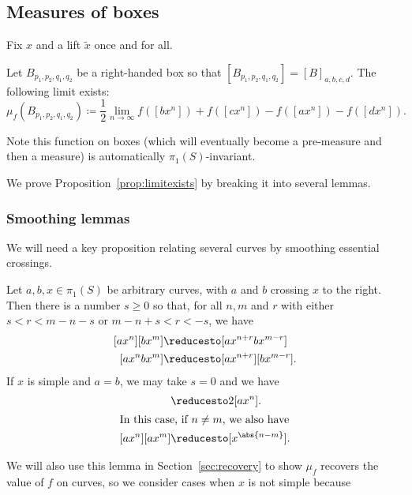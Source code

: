 \subsection{Measures of boxes}

Fix $x$ and a lift $\tilde{x}$ once and for all.

\begin{proposition}
\label{prop:limitexists}
Let $B_{p_1,p_2,q_1,q_2}$ be a right-handed box so that $[B_{p_1,p_2,q_1,q_2}]=[B]_{a,b,c,d}$.
The following limit exists:
\[
\mu_{f}(B_{p_1,p_2,q_1,q_2})\coloneqq\frac{1}{2}\lim_{n \to \infty}f([bx^n]) + f([cx^n])-f([ax^n]) - f([dx^n]).
\]
\end{proposition}
Note this function on boxes (which will eventually become a pre-measure and
then a measure) is automatically $\pi_1(S)$-invariant.

We prove Proposition~\ref{prop:limitexists} by breaking it into several lemmas.

\subsubsection{Smoothing lemmas}

We will need a key proposition relating several curves by smoothing
essential crossings.

\begin{figure}
\end{figure}

\begin{proposition}\label{prop:join-split-geom}
Let $a,b,x \in \pi_1(S)$ be arbitrary curves, with $a$ and $b$
crossing $x$ to the right. Then there is a number $s \ge 0$
  so that, for all
 $n,m$ and $r$ with either $s < r < m-n-s$ or $m-n+s < r < -s$, we have
  \begin{align}
    \label{eq:cross_a} [a x^n] [b x^m] &\reducesto [ax^{n+r}bx^{m-r}]\\
    \label{eq:cross_b} [a x^nb x^m] &\reducesto [ax^{n+r}][bx^{m-r}].
  \end{align}
  If $x$ is simple and $a=b$, we may take $s=0$ and we have
  \begin{align}
    [a x^{n+1}] [a x^{n-1}] &\reducesto 2[ax^{n}].\label{eq:cross-red2} \\
    \intertext{In this case, if $n \ne m$, we also have}
    [ax^n][ax^m] &\reducesto [x^{\abs{n-m}}].\label{eq:cross-red3}
  \end{align}
\end{proposition}
We will also use this lemma in Section~\ref{sec:recovery} to show
$\mu_f$ recovers the value of $f$ on curves, so we consider cases when
$x$ is not simple because

